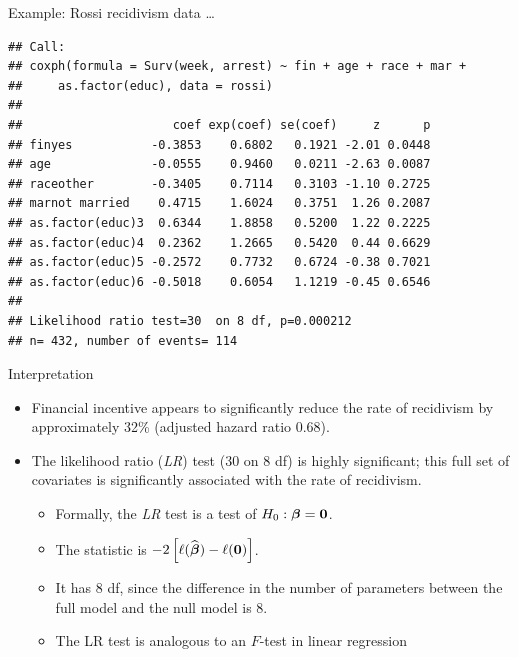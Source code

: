 \documentclass[ignorenonframetext,]{beamer}
\newcommand{\bbeta}{\mbox{\boldmath$\beta$}}
\begin{document}
\begin{frame}[fragile]{%
\protect\hypertarget{example-rossi-recidivism-data-3}{%
Example: Rossi recidivism data \ldots}}

\footnotesize

\begin{verbatim}
## Call:
## coxph(formula = Surv(week, arrest) ~ fin + age + race + mar + 
##     as.factor(educ), data = rossi)
## 
##                     coef exp(coef) se(coef)     z      p
## finyes           -0.3853    0.6802   0.1921 -2.01 0.0448
## age              -0.0555    0.9460   0.0211 -2.63 0.0087
## raceother        -0.3405    0.7114   0.3103 -1.10 0.2725
## marnot married    0.4715    1.6024   0.3751  1.26 0.2087
## as.factor(educ)3  0.6344    1.8858   0.5200  1.22 0.2225
## as.factor(educ)4  0.2362    1.2665   0.5420  0.44 0.6629
## as.factor(educ)5 -0.2572    0.7732   0.6724 -0.38 0.7021
## as.factor(educ)6 -0.5018    0.6054   1.1219 -0.45 0.6546
## 
## Likelihood ratio test=30  on 8 df, p=0.000212
## n= 432, number of events= 114
\end{verbatim}

\end{frame}

\begin{frame}{%
\protect\hypertarget{interpretation-1}{%
Interpretation}}

\begin{itemize}
\item
  Financial incentive appears to significantly reduce the rate of
  recidivism by approximately 32\% (adjusted hazard ratio 0.68).
\item
  The likelihood ratio (\emph{LR}) test (30 on 8 df) is highly
  significant; this full set of covariates is significantly associated
  with the rate of recidivism.

  \begin{itemize}
  \item
    Formally, the \emph{LR} test is a test of \(H_0:\bbeta = {\bf 0}\).
  \item
    The statistic is
    \(-2\left[\ell(\widehat{\bbeta}) - \ell({\bf 0})\right]\).
  \item
    It has 8 df, since the difference in the number of parameters
    between the full model and the null model is 8.
  \item
    The LR test is analogous to an \(F\)-test in linear regression
  \end{itemize}
\end{itemize}

\end{frame}
\end{document}
